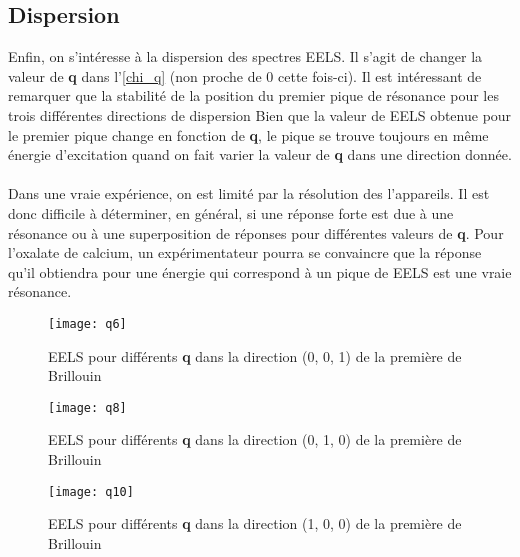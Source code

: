 \subsection{Dispersion}
Enfin, on s'intéresse à la dispersion des spectres EELS\@.
Il s'agit de changer la valeur de \textbf{q} dans l'\cref{chi_q} (non proche de 0 cette fois-ci).
Il est intéressant de remarquer que la stabilité de la position du premier pique de résonance pour les trois différentes directions de dispersion%
Bien que la valeur de EELS obtenue pour le premier pique change en fonction de \textbf{q}, le pique se trouve toujours en même énergie d'excitation quand on fait varier la valeur de \textbf{q} dans une direction donnée.
\\\\
Dans une vraie expérience, on est limité par la résolution des l'appareils.
Il est donc difficile à déterminer, en général, si une réponse forte est due à une résonance ou à une superposition de réponses pour différentes valeurs de \textbf{q}.
Pour l'oxalate de calcium, un expérimentateur pourra se convaincre que la réponse qu'il obtiendra pour une énergie qui correspond à un pique de EELS est une vraie résonance.


\begin{figure}[!h]\label{q6}
    \centering
    \texttt{[image: q6]}
    \caption{EELS pour différents \textbf{q} dans la direction (0, 0, 1) de la première de Brillouin}
\end{figure}

\begin{figure}[!h]\label{q8}
    \centering
    \texttt{[image: q8]}
    \caption{EELS pour différents \textbf{q} dans la direction (0, 1, 0) de la première de Brillouin}
\end{figure}
\begin{figure}[!h]\label{q10}
    \centering
    \texttt{[image: q10]}
    \caption{EELS pour différents \textbf{q} dans la direction (1, 0, 0) de la première de Brillouin}
\end{figure}
